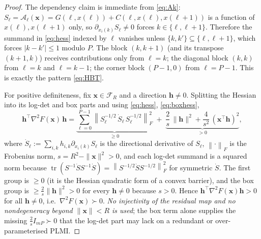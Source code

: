 \documentclass{amsart}
\newcommand{\tr}{\operatorname{tr}}
\newcommand{\norm}[1]{\left\lVert#1\right\rVert}
\begin{document}
\begin{proof}
The dependency claim is immediate from \eqref{eq:Ak}: $S_\ell=\mathcal A_\ell(\bm
x)=G(\ell,x(\ell))+C(\ell,x(\ell),x(\ell+1))$ is a function of $x(\ell),x(\ell+1)$
only, so $\partial_{x_i(k)}S_\ell\neq0$ forces $k\in\{\ell,\ell+1\}$. Therefore the
summand in \eqref{eq:hess} indexed by $\ell$ vanishes unless
$\{k,k'\}\subseteq\{\ell,\ell+1\}$, which forces $|k-k'|\le1$ modulo $P$. The block
$(k,k+1)$ (and its transpose $(k+1,k)$) receives contributions only from $\ell=k$;
the diagonal block $(k,k)$ from $\ell=k$ and $\ell=k-1$; the corner block $(P-1,0)$
from $\ell=P-1$. This is exactly the pattern \eqref{eq:HBT}.

For positive definiteness, fix $\bm x\in\mathcal F_R$ and a direction $\bm h\neq0$.
Splitting the Hessian into its log-det and box parts and using \eqref{eq:hess},
\eqref{eq:boxhess},
\[
  \bm h^{\!\top}\nabla^2 F(\bm x)\,\bm h
  =\underbrace{\sum_{\ell=0}^{P-1}\norm{S_\ell^{-1/2}\,\dot S_\ell\,S_\ell^{-1/2}}_F^2}_{\ge0}
   \;+\;\underbrace{\frac{2}{s}\,\|\bm h\|^2+\frac{4}{s^2}\,(\bm x^{\!\top}\bm h)^2}_{>0},
\]
where $\dot S_\ell:=\sum_{i,k}h_{i,k}\partial_{x_i(k)}S_\ell$ is the directional
derivative of $S_\ell$, $\norm{\cdot}_F$ is the Frobenius norm, $s=R^2-\|\bm x\|^2>0$,
and each log-det summand is a squared norm because
$\tr(S^{-1}\dot S S^{-1}\dot S)=\norm{S^{-1/2}\dot S S^{-1/2}}_F^2$ for symmetric
$\dot S$. The first group is $\ge0$ (it is the Hessian quadratic form of a convex
barrier), and the box group is $\ge\frac{2}{s}\|\bm h\|^2>0$ for every $\bm h\neq0$
because $s>0$. Hence $\bm h^{\!\top}\nabla^2F(\bm x)\bm h>0$ for all $\bm h\neq0$,
i.e.\ $\nabla^2F(\bm x)\succ0$. \emph{No injectivity of the residual map and no
nondegeneracy beyond $\|\bm x\|<R$ is used}; the box term alone supplies the missing
$\frac{2}{s}I_{mP}\succ0$ that the log-det part may lack on a redundant or
over-parameterised PLMI.
\end{proof}
\end{document}
